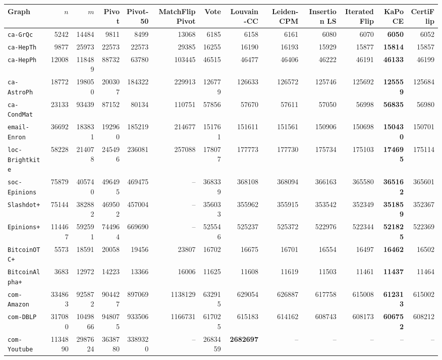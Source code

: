 \begin{tabular}{lrrrrrrrrrrrr}
\toprule
Graph & $n$ & $m$ & Pivot & Pivot-50 & MatchFlipPivot & Vote & Louvain-CC & Leiden-CPM & Insertion LS & IteratedFlip & KaPoCE & CertiFlip\\
\midrule
\texttt{ca-GrQc} & 5242 & 14484 & 9811 & 8499 & 13068 & 6185 & 6158 & 6161 & 6080 & 6070 & \textbf{6050} & 6052\\
\texttt{ca-HepTh} & 9877 & 25973 & 22573 & 22573 & 29385 & 16255 & 16190 & 16193 & 15929 & 15877 & \textbf{15814} & 15857\\
\texttt{ca-HepPh} & 12008 & 118489 & 88732 & 63780 & 103445 & 46515 & 46477 & 46406 & 46222 & 46191 & \textbf{46133} & 46199\\
\texttt{ca-AstroPh} & 18772 & 198050 & 200307 & 184322 & 229913 & 126779 & 126633 & 126572 & 125746 & 125692 & \textbf{125559} & 125684\\
\texttt{ca-CondMat} & 23133 & 93439 & 87152 & 80134 & 110751 & 57856 & 57670 & 57611 & 57050 & 56998 & \textbf{56835} & 56980\\
\texttt{email-Enron} & 36692 & 183831 & 192960 & 185219 & 214677 & 151761 & 151611 & 151561 & 150906 & 150698 & \textbf{150430} & 150701\\
\texttt{loc-Brightkite} & 58228 & 214078 & 245496 & 236081 & 257088 & 178077 & 177773 & 177730 & 175734 & 175103 & \textbf{174695} & 175114\\
\texttt{soc-Epinions} & 75879 & 405740 & 496495 & 469475 & -- & 368339 & 368108 & 368094 & 366163 & 365580 & \textbf{365162} & 365601\\
\texttt{Slashdot+} & 75144 & 382882 & 469502 & 457004 & -- & 356033 & 355962 & 355915 & 353542 & 352349 & \textbf{351859} & 352367\\
\texttt{Epinions+} & 114467 & 592591 & 744964 & 669690 & -- & 525546 & 525237 & 525372 & 522976 & 522344 & \textbf{521825} & 522369\\
\texttt{BitcoinOTC+} & 5573 & 18591 & 20058 & 19456 & 23807 & 16702 & 16675 & 16701 & 16554 & 16497 & \textbf{16462} & 16502\\
\texttt{BitcoinAlpha+} & 3683 & 12972 & 14223 & 13366 & 16006 & 11625 & 11608 & 11619 & 11503 & 11461 & \textbf{11437} & 11464\\
\texttt{com-Amazon} & 334863 & 925872 & 904427 & 897069 & 1138129 & 632915 & 629054 & 626887 & 617758 & 615008 & \textbf{612313} & 615002\\
\texttt{com-DBLP} & 317080 & 1049866 & 948075 & 933506 & 1166731 & 617025 & 615183 & 614162 & 608743 & 608173 & \textbf{606752} & 608212\\
\texttt{com-Youtube} & 1134890 & 2987624 & 3638780 & 3389320 & -- & 2683459 & \textbf{2682697} & -- & -- & -- & -- & --\\
\bottomrule
\end{tabular}
